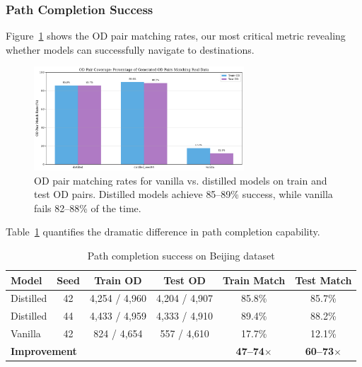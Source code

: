 \subsubsection{Path Completion Success}

Figure~\ref{fig:od-matching} shows the OD pair matching rates, our most critical metric revealing whether models can successfully navigate to destinations.

\begin{figure}[h]
    \centering
    \includegraphics[width=0.7\textwidth]{assets/plots/hoser/od_matching_rates.pdf}
    \caption{OD pair matching rates for vanilla vs. distilled models on train and test OD pairs. Distilled models achieve 85--89\% success, while vanilla fails 82--88\% of the time.}
    \label{fig:od-matching}
\end{figure}

Table~\ref{tab:od-results} quantifies the dramatic difference in path completion capability.

\begin{table}[h]
    \centering
    \caption{Path completion success on Beijing dataset}
    \label{tab:od-results}
    \small
    \begin{tabular}{lccccc}
        \toprule
        \textbf{Model}                           & \textbf{Seed}           & \textbf{Train OD}       & \textbf{Test OD} & \textbf{Train Match} & \textbf{Test Match} \\
        \midrule
        Distilled                                & 42                      & 4,254 / 4,960           & 4,204 / 4,907    & 85.8\%               & 85.7\%              \\
        Distilled                                & 44                      & 4,433 / 4,959           & 4,333 / 4,910    & 89.4\%               & 88.2\%              \\
        Vanilla                                  & 42                      & 824 / 4,654             & 557 / 4,610      & 17.7\%               & 12.1\%              \\
        \midrule
        \multicolumn{4}{l}{\textbf{Improvement}} & \textbf{47--74$\times$} & \textbf{60--73$\times$}                                                                 \\
        \bottomrule
    \end{tabular}
\end{table}

